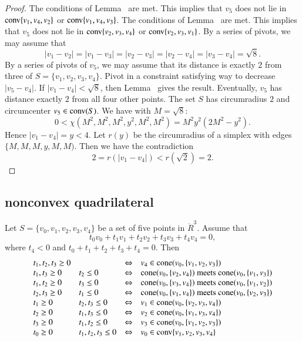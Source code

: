 \begin{proof}
The conditions of Lemma~ are met. This implies
that $v_5$ does not lie in ${\operatorname{conv}}\{v_1,v_4,v_2\}$ or
	${\operatorname{conv}}\{v_1,v_4,v_3\}$.
The conditions of Lemma~ are met.  This implies that
$v_5$ does not lie in ${\operatorname{conv}}\{v_2,v_3,v_4\}$ or
	${\operatorname{conv}}\{v_2,v_3,v_1\}$.
By a series of pivots, we may assume that
	$$|v_1-v_2|=|v_1-v_3|=|v_2-v_3|=|v_2-v_4|=|v_3-v_4|=\sqrt8.$$
By a series of pivots of $v_5$, we may assume that its distance is exactly
$2$ from three of $S=\{v_1,v_2,v_3,v_4\}$.  
Pivot in a constraint satisfying way to decrease $|v_5-v_4|$.
If $|v_1-v_4|<\sqrt8$, then Lemma~ %
gives the
result.
Eventually, $v_5$ has distance exactly $2$ from all four other points.
The set $S$ has circumradius $2$ and circumcenter $v_5\in{\operatorname{conv}}(S)$.  
	We have with $M=\sqrt8$:
	$$0 < \chi(M^2,M^2,M^2,y^2,M^2,M^2)= M^2 y^2 (2M^2 - y^2).$$
Hence $|v_1-v_4|=y < 4$.
Let $r(y)$ be the circumradius of a simplex with edges $\{M,M,M,y,M,M)$.
Then we have the contradiction
	$$2 = r(|v_1-v_4|) < r(\sqrt2) = 2.$$
\end{proof}



\newpage




\subsection{nonconvex quadrilateral}

\begin{lemma}
Let $S=\{v_0,v_1,v_2,v_3,v_4\}$ be a set of five points in
$\ring{R}^3$.
Assume that
   $$
   t_0 v_0 + t_1 v_1 + t_2 v_2 + t_3 v_3 + t_4 v_4 = 0,
   $$
where $t_4 < 0$ and $t_0+t_1+t_2+t_3+t_4=0$.
Then
   $$
   \def\lr{\Leftrightarrow}
   \def\m{ \text{ meets } }
   \def\cc{\op{cone}}
   \begin{array}{llcl}
  t_1,t_2,t_3\ge 0  &      &\lr& v_4\in\cc(v_0,\{v_1,v_2,v_3\})\\
  t_1,t_3\ge 0 & t_2\le 0  &\lr& \cc(v_0,\{v_2,v_4\})\m\cc(v_0,\{v_1,v_3\})\\
  t_1,t_2\ge 0 & t_3\le 0  &\lr& \cc(v_0,\{v_3,v_4\})\m\cc(v_0,\{v_1,v_2\})\\
  t_2,t_3\ge 0 & t_1\le 0  &\lr& \cc(v_0,\{v_1,v_4\})\m\cc(v_0,\{v_2,v_3\})\\
  t_1\ge0     & t_2,t_3\le0&\lr& v_1\in\cc(v_0,\{v_2,v_3,v_4\})\\
  t_2\ge0     & t_1,t_3\le0&\lr& v_2\in\cc(v_0,\{v_1,v_3,v_4\})\\
  t_3\ge0     & t_1,t_2\le0&\lr& v_3\in\cc(v_0,\{v_1,v_2,v_3\})\\
  t_0\ge0  &t_1,t_2,t_3\le0&\lr& v_0\in\op{conv}\{v_1,v_2,v_3,v_4\}\\
   \end{array}
   $$
\end{lemma}

